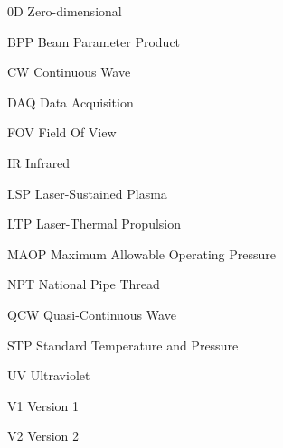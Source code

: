     \begin{nomlist}
        \item[0D]               Zero-dimensional
        \item[BPP]              Beam Parameter Product
        \item[CW]               Continuous Wave
        \item[DAQ]              Data Acquisition
        \item[FOV]              Field Of View
        \item[IR]               Infrared  
        \item[LSP]              Laser-Sustained Plasma
        \item[LTP]              Laser-Thermal Propulsion
        \item[MAOP]             Maximum Allowable Operating Pressure
        \item[NPT]              National Pipe Thread
        \item[QCW]              Quasi-Continuous Wave
        \item[STP]              Standard Temperature and Pressure 
        \item[UV]               Ultraviolet 
        \item[V1]               Version 1
        \item[V2]               Version 2 
    \end{nomlist}

    

